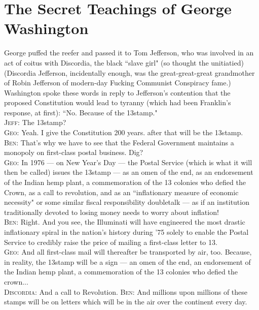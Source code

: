 \chapter{The Secret Teachings of George Washington}

George puffed the reefer and passed it to Tom Jefferson, who was involved in an act of coitus with Discordia, the black ``slave girl" (so thought the unitiatied) (Discordia Jefferson, incidentally enough, was the great-great-great grandmother of Robin Jefferson of modern-day Fucking Communist Conspiracy fame.)\\
Washington spoke these words in reply to Jefferson's contention that the proposed Constitution would lead to tyranny (which had been Franklin's response, at first): ``No. Because of the 13\cent stamp."\\
\textsc{Jeff:} The 13\cent stamp?\\
\textsc{Geo:} Yeah. I give the Constitution 200 years. after that will be the 13\cent stamp.\\
\textsc{Ben:} That's why we have to see that the Federal Government maintains a monopoly on first-class postal business. Dig?\\
\textsc{Geo:} In 1976 --- on New Year's Day --- the Postal Service (which is what it will then be called) issues the 13\cent stamp --- as an omen of the end, as an endorsement of the Indian hemp plant, a commemoration of the 13 colonies who defied the Crown, as a call to revolution, and as an ``inflationary measure of economic necessity" or some similar fiscal responsibility doubletalk --- as if an institution traditionally devoted to losing money needs to worry about inflation!\\
\textsc{Ben:} Right. And you see, the Illuminati will have engineered the most drastic inflationary spiral in the nation's history during '75 solely to enable the Postal Service to credibly raise the price of mailing a first-class letter to 13\cent.\\
\textsc{Geo:} And all first-class mail will thereafter be transported by air, too. Because, in reality, the 13\cent stamp will be a sign --- an omen of the end, an endorsement of the Indian hemp plant, a commemoration of the 13 colonies who defied the crown...\\
\textsc{Discordia:} And a call to Revolution.
\textsc{Ben:} And millions upon millions of these stamps will be on letters which will be in the air over the continent every day.\\
